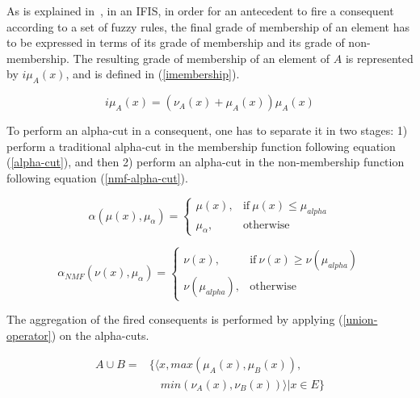\documentclass{ieeeaccess}
\begin{document}

As is explained in~\cite{Hernandez-Aguila2016}, in an IFIS, in order for an
antecedent to fire a consequent according to a set of fuzzy rules, the final
grade of membership of an element has to be expressed in terms of its grade of
membership and its grade of non-membership. The resulting grade of membership of
an element of $A$ is represented by $i\mu_{A}(x)$, and is defined in
(\ref{imembership}).

\begin{equation}
  \label{imembership}
  i\mu_{A}(x) = (\nu_{A}(x) + \mu_{A}(x))\mu_{A}(x)
\end{equation}

To perform an alpha-cut in a consequent, one has to separate it in two stages:
1) perform a traditional alpha-cut in the membership function following equation
(\ref{alpha-cut}), and then 2) perform an alpha-cut in the non-membership
function following equation (\ref{nmf-alpha-cut}).

\begin{equation}
  \label{alpha-cut}
  \alpha(\mu (x),\mu_{\alpha}) =
  \begin{cases}
    \mu (x), & \text{if}\ \mu (x) \leq \mu_{alpha}  \\
    \mu_{\alpha}, & \text{otherwise}
  \end{cases}
\end{equation}

\begin{equation}
  \label{nmf-alpha-cut}
  \alpha_{NMF}(\nu (x),\mu_{\alpha}) =
  \begin{cases}
    \nu (x), & \text{if}\ \nu (x) \geq \nu (\mu_{alpha})  \\
    \nu (\mu_{alpha}), & \text{otherwise}
  \end{cases}
\end{equation}

The aggregation of the fired consequents is performed by applying
(\ref{union-operator}) on the alpha-cuts.

\begin{equation}
  \label{union-operator}
  \begin{aligned}
    A \cup B  = &\{ \langle x, max(\mu_{A} (x), \mu_{B} (x)),\\
    &\quad min(\nu_{A} (x), \nu_{B} (x)) \rangle | x \in E \}
\end{aligned}
\end{equation}
\end{document}

